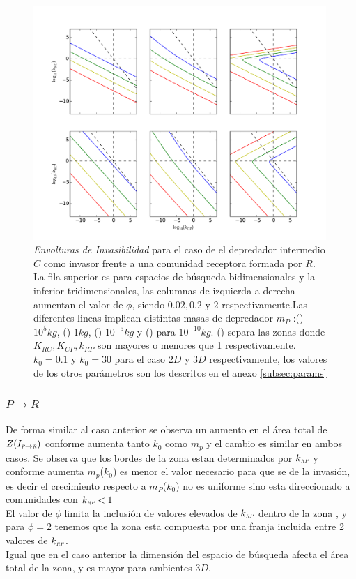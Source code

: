 \begin{figure}
  \centering
  \includegraphics[width = 0.99\textwidth]{./Plots/Z(IC2)AcGrGr.pdf}
  \caption[Env $Z(IC2)$]{\emph{Envolturas de Invasibilidad} para el caso de el depredador intermedio $C$ como invasor frente a una comunidad receptora formada por $R$. La fila superior es para espacios de b\'usqueda bidimensionales y la inferior tridimensionales, las columnas de izquierda a derecha aumentan el valor de $\phi$, siendo $0.02,0.2$ y $2$ respectivamente.Las diferentes lineas implican distintas masas de depredador $m_P$ :({\hwplotR}) $10^5 kg$,  ({\hwplotY}) $1kg$, ({\hwplotG}) $10^{-5}kg$ y ({\hwplotB}) para $10^{-10}kg$. ({\hwplotK}) separa las zonas donde $K_{RC},K_{CP},k_{RP}$ son mayores o menores que 1 respectivamente. $k_0 = 0.1$ y $k_0 = 30$ para el caso $2D$ y $3D$ respectivamente, los valores de los otros par\'ametros son los descritos en el anexo \ref{subsec:params}}
  \label{fig:Z(IC2)}
\end{figure}

\subsubsection{$ P  \to R$}

De forma similar al caso anterior se observa un aumento en el \'area total de $Z(I_{\textit{\tiny P} \to \textit{\tiny R}})$ conforme aumenta tanto $k_0$ como $m_p$ y el cambio es similar en ambos casos. Se observa que los bordes de la zona estan determinados por $k_{\textit{\tiny RP}}$ y conforme aumenta $m_p$($k_0$) es menor el valor necesario para que se de la invasi\'on, es decir el crecimiento respecto a $m_P$($k_0$) no es uniforme sino esta direccionado a comunidades con $k_{\textit{\tiny RP}} < 1 $ \\
El valor de $\phi$ limita la inclusi\'on de valores elevados de $k_{\textit{\tiny RP}}$ dentro de la zona , y para $\phi = 2$ tenemos que la zona esta compuesta por una franja incluida entre 2 valores de $k_{\textit{\tiny RP}}$.\\
Igual que en el caso anterior la dimensi\'on del espacio de b\'usqueda afecta el \'area total de la zona, y es mayor para ambientes $3D$.

